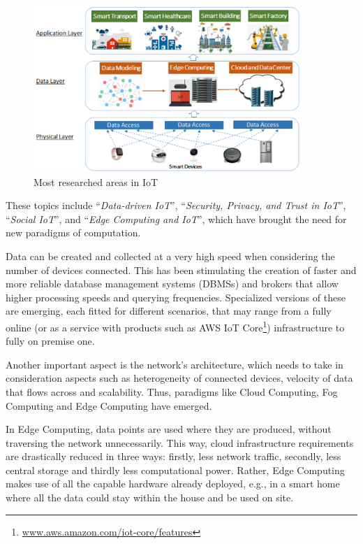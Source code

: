 			\begin{figure}[h]
				\centering
				\includegraphics[width=0.9\textwidth]{resources/img/chap2/iot_research_areas}
				\caption[Most researched areas in IoT]{Most researched areas in IoT \cite{9319033}}
				\label{iot_research_areas}
			\end{figure}
		
			These topics include ``\textit{Data-driven IoT}'', ``\textit{Security, Privacy, and Trust in IoT}'', ``\textit{Social IoT}'', and ``\textit{Edge Computing and IoT}'', which have brought the need for new paradigms of computation.
			
			Data can be created and collected at a very high speed when considering the number of devices connected.
			This has been stimulating the creation of faster and more reliable database management systems (DBMSs) and brokers that allow higher processing speeds and querying frequencies.
			Specialized versions of these are emerging, each fitted for different scenarios, that may range from a fully online (or as a service with products such as AWS IoT Core\footnote{ \url{www.aws.amazon.com/iot-core/features}}) infrastructure to fully on premise one.
			
			Another important aspect is the network's architecture, which needs to take in consideration aspects such as heterogeneity of connected devices, velocity of data that flows across and scalability.
			Thus, paradigms like Cloud Computing, Fog Computing and Edge Computing have emerged.
			
			In Edge Computing, data points are used where they are produced, without traversing the network unnecessarily.
			This way, cloud infrastructure requirements are drastically reduced in three ways: ﬁrstly, less network traffic, secondly, less central storage and thirdly less computational power.
			Rather, Edge Computing makes use of all the capable hardware already deployed, e.g., in a smart home where all the data could stay within the house and be used on site.
			

